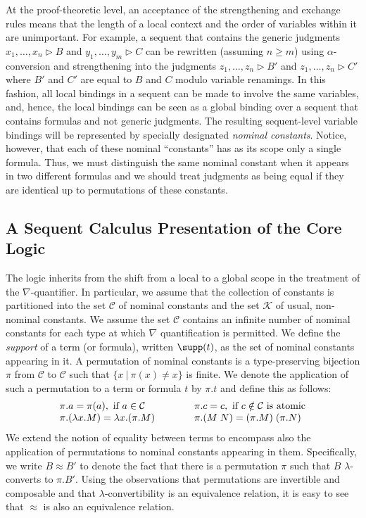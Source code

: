 At the proof-theoretic level, an acceptance of the strengthening and
exchange rules means
that the length of a local context and the order of variables within
it are unimportant.  For example, a sequent that contains the generic
judgments $x_1,\ldots,x_n\triangleright B$  and
$y_1,\ldots,y_m\triangleright C$ can be rewritten (assuming  $n\ge m$)
using
$\alpha$-conversion and strengthening into the judgments
 $z_1,\ldots,z_n\triangleright B'$  and
$z_1,\ldots,z_n\triangleright C'$ where $B'$ and $C'$ are
equal to $B$ and $C$ modulo variable renamings.  In this fashion, all
local bindings in a sequent can be made to involve the same
variables, and, hence, the local bindings can be seen as a global
binding over a sequent that contains formulas and not generic
judgments.  The resulting sequent-level variable bindings will be represented by
specially designated {\it nominal constants}.
Notice, however, that each of these nominal ``constants'' has as its scope only a single
formula.  Thus, we must distinguish the same nominal constant when it
appears in two different formulas and we should treat judgments
as being equal if they are identical up to permutations of these
constants.


\subsection{A Sequent Calculus Presentation of the Core Logic}

The logic \logic inherits from \LG the shift from a local to a global
scope in the treatment of the $\nabla$-quantifier.  In particular,
we assume that the collection of constants is partitioned into the set
$\mathcal{C}$ of nominal constants and the set $\mathcal{K}$ of
usual, non-nominal constants.
We assume the set $\mathcal{C}$ contains an infinite number of nominal
constants for each type at which $\nabla$ quantification is permitted.
We define the {\it support} of a term (or
formula), written $\supp(t)$, as the set of nominal constants
appearing in it.
A permutation of nominal constants is a type-preserving bijection $\pi$ from
$\mathcal{C}$ to $\mathcal{C}$ such that $\{ x\ |\ \pi(x) \neq x\}$ is
finite.  We denote the application of such a
permutation to a term or formula $t$ by $\pi . t$ and define this as
follows:
\[
\begin{array}{l@{\qquad\qquad }l}
\pi.a = \pi(a), \mbox{ if $a \in \mathcal{C}$} &
\pi.c = c, \mbox{ if $c\notin \mathcal{C}$ is atomic} \\
\pi.(\lambda x.M) = \lambda x.(\pi.M) &
\pi.(M\; N) = (\pi.M)\; (\pi.N)
\end{array}
\]
We extend the notion of equality between terms to encompass also
the application of permutations to nominal constants appearing in
them. Specifically, we write $B \approx B'$ to denote the fact that
there is a permutation $\pi$ such that $B$ $\lambda$-converts to
$\pi.B'$. Using the observations that permutations are invertible and
composable and that $\lambda$-convertibility is an equivalence
relation, it is easy to see that $\approx$ is also an equivalence
relation.


